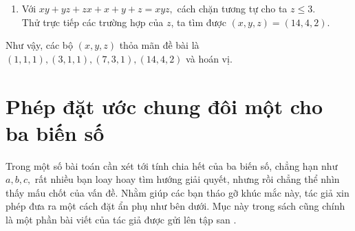 \begin{gbtt}
{\begin{enumerate}
    \begin{itemize}
        \item{} Nếu như $z=1,$ ta có
        $$xy+y+x+x+y+1=2xy\Leftrightarrow xy-2x-2y-1=0\Leftrightarrow(x-2)(y-2)=5.$$
        Giải phương trình ước số trên, ta suy ra $(x,y)=(7,3).$
        \item{} Nếu như $z=2,$ ta có
         $$xy+2y+2x+x+y+2=4xy\Leftrightarrow 3xy-3x-3y=2.$$
        Điều này không thể xảy ra vì $3xy-3x-3y$ chia hết cho $3$ còn $1$ không chia hết cho $2$.
    \end{itemize}
    \item Với $xy+yz+zx+x+y+z=xyz,$ cách chặn tương tự cho ta $z\le3.$ \\Thử trực tiếp các trường hợp của $z$, ta tìm được $(x,y,z)=(14,4,2).$
\end{enumerate}
Như vậy, các bộ $(x,y,z)$ thỏa mãn đề bài là $(1,1,1),(3,1,1), (7,3,1),(14,4,2)$ và hoán vị.}
\end{gbtt}

\section{Phép đặt ước chung đôi một cho ba biến số}
    Trong một số bài toán cần xét tới tính chia hết của ba biến số, chẳng hạn như $a,b,c,$ rất nhiều bạn loay hoay tìm hướng giải quyết, nhưng rồi chẳng thể nhìn thấy mấu chốt của vấn đề. Nhằm giúp các bạn tháo gỡ khúc mắc này, tác giả xin phép đưa ra một cách đặt ẩn phụ như bên dưới. Mục này trong sách cũng chính là một phần bài viết của tác giả  được gửi lên tập san .
